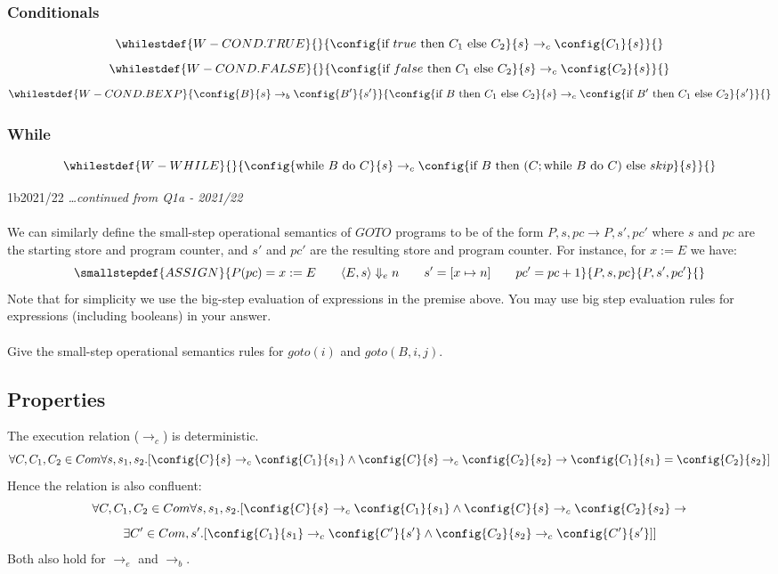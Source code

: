 \subsubsection{Conditionals}
\[\whilestdef{W-COND.TRUE}{}{\config{\text{if } true \text{ then } C_1 \text{ else } C_2}{s} \to_c \config{C_1}{s}}{}\]
\[\whilestdef{W-COND.FALSE}{}{\config{\text{if } false \text{ then } C_1 \text{ else } C_2}{s} \to_c \config{C_2}{s}}{}\]
\[\whilestdef{W-COND.BEXP}{
		\config{B}{s} \to_b \config{B'}{s'}
	}{\config{\text{if } B \text{ then } C_1 \text{ else } C_2}{s} \to_c \config{\text{if } B' \text{ then } C_1 \text{ else } C_2}{s'}}{}\]
\subsubsection{While}
\[\whilestdef{W-WHILE}{}{
		\config{\text{while } B \text{ do } C}{s} \to_c \config{\text{if } B \text{ then } (C; \text{while } B \text{ do } C) \text{ else } skip}{s}
	}{}\]

\begin{exambox}{1b}{2021/22}
	\textit{\dots continued from Q1a - 2021/22}
	\\
	\\ We can similarly define the small-step operational semantics of $GOTO$ programs
	to be of the form $ P, s, pc  \to  P, s', pc' $ where $s$ and $pc$ are the starting store and program counter, and $s'$ and $pc'$ are the resulting store and program counter.
	For instance, for $x := E$ we have:
	\[\smallstepdef{ASSIGN}{P(pc) = x := E \qquad \langle E, s \rangle \Downarrow_e n \qquad s' = [x \mapsto n] \qquad pc' = pc + 1}{P, s, pc}{P, s', pc'}{}\]
	Note that for simplicity we use the big-step evaluation of expressions in the premise above. You may use big step evaluation rules for expressions (including booleans) in your answer.
	\\
	\\ Give the small-step operational semantics rules for $goto(i)$ and $goto(B, i, j)$. 
\end{exambox}
\subsection{Properties}
The execution relation ($\to_c$) is deterministic.
\[\forall C,C_1,C_2 \in Com \forall s,s_1,s_2 .[\config{C}{s} \to_c \config{C_1}{s_1} \land \config{C}{s} \to_c \config{C_2}{s_2} \rightarrow \config{C_1}{s_1} = \config{C_2}{s_2}]\]
Hence the relation is also confluent:
\[\forall C,C_1,C_2 \in Com \forall s,s_1,s_2 .[\config{C}{s} \to_c \config{C_1}{s_1} \land \config{C}{s} \to_c \config{C_2}{s_2} \rightarrow \]
			\[\exists C' \in Com, s' . [\config{C_1}{s_1} \to_c \config{C'}{s'} \land \config{C_2}{s_2}\to_c \config{C'}{s'} ]]\]
Both also hold for $\to_e$ and $\to_b$.

